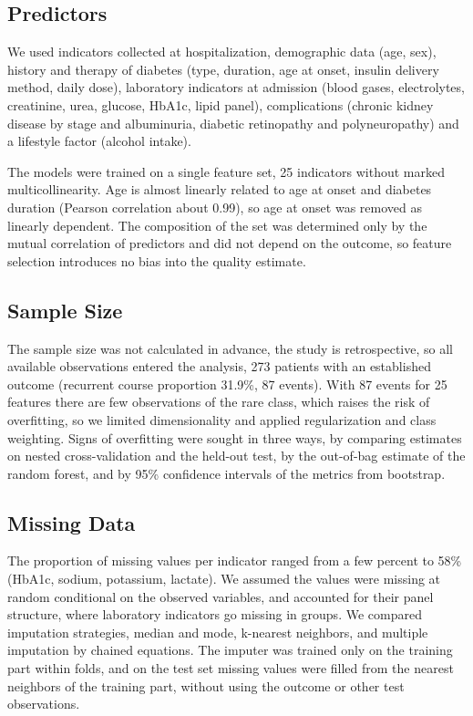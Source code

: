 \documentclass[pdflatex,sn-basic,Numbered]{sn-jnl}
\begin{document}
\subsection{Predictors}\label{subsec2_4}

We used indicators collected at hospitalization, demographic data (age, sex), history and therapy of diabetes (type, duration, age at onset, insulin delivery method, daily dose), laboratory indicators at admission (blood gases, electrolytes, creatinine, urea, glucose, HbA1c, lipid panel), complications (chronic kidney disease by stage and albuminuria, diabetic retinopathy and polyneuropathy) and a lifestyle factor (alcohol intake).

The models were trained on a single feature set, 25 indicators without marked multicollinearity. Age is almost linearly related to age at onset and diabetes duration (Pearson correlation about 0.99), so age at onset was removed as linearly dependent. The composition of the set was determined only by the mutual correlation of predictors and did not depend on the outcome, so feature selection introduces no bias into the quality estimate.

\subsection{Sample Size}\label{subsec2_5}

The sample size was not calculated in advance, the study is retrospective, so all available observations entered the analysis, 273 patients with an established outcome (recurrent course proportion 31.9\%, 87 events). With 87 events for 25 features there are few observations of the rare class, which raises the risk of overfitting, so we limited dimensionality and applied regularization and class weighting. Signs of overfitting were sought in three ways, by comparing estimates on nested cross-validation and the held-out test, by the out-of-bag estimate of the random forest, and by 95\% confidence intervals of the metrics from bootstrap.

\subsection{Missing Data}\label{subsec2_6}

The proportion of missing values per indicator ranged from a few percent to 58\% (HbA1c, sodium, potassium, lactate). We assumed the values were missing at random conditional on the observed variables, and accounted for their panel structure, where laboratory indicators go missing in groups. We compared imputation strategies, median and mode, k-nearest neighbors, and multiple imputation by chained equations. The imputer was trained only on the training part within folds, and on the test set missing values were filled from the nearest neighbors of the training part, without using the outcome or other test observations.
\end{document}

